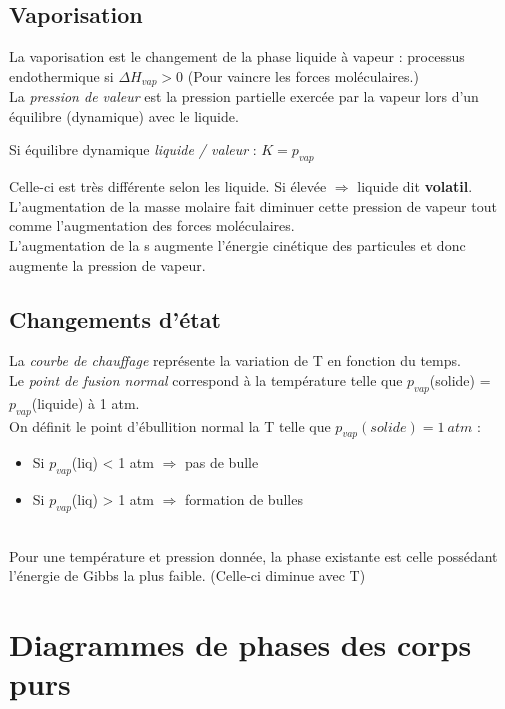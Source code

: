 \documentclass[british,french,11pt, a4paper, openany]{book}
\begin{document}
\subsection{Vaporisation}
La vaporisation est le changement de la phase liquide à vapeur : processus endothermique si $\Delta H_{vap} > 0$ (Pour vaincre les forces moléculaires.)\\
La \textit{pression de valeur} est la pression partielle exercée par la vapeur lors d'un équilibre (dynamique) avec le liquide.
\begin{center}
	Si équilibre dynamique \textit{liquide / valeur} : $K = p_{vap}$
\end{center}
Celle-ci est très différente selon les liquide. Si élevée $\Rightarrow$ liquide dit \textbf{volatil}.\\
L'augmentation de la masse molaire fait diminuer cette pression de vapeur tout comme l'augmentation des forces moléculaires.\\
L'augmentation de la s augmente l'énergie cinétique des particules et donc augmente la pression de vapeur.

\subsection{Changements d'état}
La \textit{courbe de chauffage} représente la variation de T en fonction du temps.\\
Le \textit{point de fusion normal} correspond à la température telle que $p_{vap}$(solide) = $p_{vap}$(liquide) à 1 atm.\\
On définit le point d'ébullition normal la T telle que $p_{vap}(solide) = 1\ atm$ :
\begin{itemize}
	\item Si $p_{vap}$(liq) < 1 atm $\Rightarrow$ pas de bulle
	\item Si $p_{vap}$(liq) > 1 atm $\Rightarrow$ formation de bulles
\end{itemize}
\ \\
Pour une température et pression donnée, la phase existante est celle possédant l'énergie de Gibbs la plus faible. (Celle-ci diminue avec T)

\section{Diagrammes de phases des corps purs}
\end{document}
